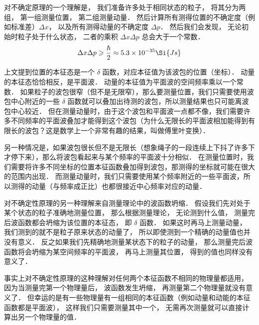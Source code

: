 对不确定原理的一个理解是， 我们准备许多处于相同状态的粒子， 将其分为两组， 第一组测量位置， 第二组测量动量． 然后计算所有测得位置的不确定度（例如标准差）$\Delta x$， 以及所有测得动量的不确定度 $\Delta p$． 然后我们会发现， 无论初始时粒子处于什么状态， 二者的乘积 $\Delta x \Delta p$ 总会大于一个常数．
\begin{equation}
\Delta x \Delta p \geqslant \frac{\hbar}{2} \approx 5.3\times 10^{-35} \Si{Js}
\end{equation}

上文提到位置的本征态是一个 $\delta$ 函数，对应本征值为该波包的位置（坐标）． 动量的本征态恰恰相反，是平面波． 动量的本征值为平面波的空间频率乘以一个常数． 如果粒子的波包很窄（但不是无限窄），那么要测量位置，我们只需要使用波包中心附近的一些 $\delta$ 函数就可以叠加出待测的波包，所以测量结果也只可能离波包中心较近． 但在测量动量时，由于这个波包和平面波一点都不像，我们需要许多不同频率的平面波叠加才能得到这个波包（为什么无限长的平面波相加能得到有限长的波包？这是数学上一个非常有趣的结果，叫做傅里叶变换）．

另一种情况是，如果波包很长但不是无限长（想象绳子的一段连续上下抖了许多下才停下来），那么将波包看起来与某个频率的平面波十分相似． 在测量位置时，我们需要将许多不同坐标的位置本征函数叠加得到波包，那测得的坐标就可能在很大的范围内出现． 而测量动量时，我们只需要使用某个频率附近的一些平面波，所以测得的动量（与频率成正比）也都很接近中心频率对应的动量．

对不确定性原理的另一种理解来自测量理论中的波函数坍缩． 假设我们先对处于某个状态的粒子准确地测量位置， 那么根据测量理论， 无论测到什么值， 测量完后波函数都会坍缩为该位置的本征态， 即 $\delta$ 函数． 如果这时再马上测量动量， 我们测到的就不是粒子原来状态的动量了， 所以即使测到一个精确的动量值也并没有意义． 反之如果我们先精确地测量某状态下的粒子的动量， 那么测量完后波函数将会坍缩为某空间频率的平面波， 再马上测量其位置， 得到的值也同样没有意义了．

事实上对不确定性原理的这种理解对任何两个本征函数不相同的物理量都适用， 因为当测量完第一个物理量后， 波函数发生坍缩， 再测量第二个物理量就没有意义了． 但幸运的是有一些物理量有一组相同的本征函数（例如动量和动能的本征函数都是平面波）， 这样我们只需要测量其中一个， 无需再次测量就可以直接计算出另一个物理量的值．
